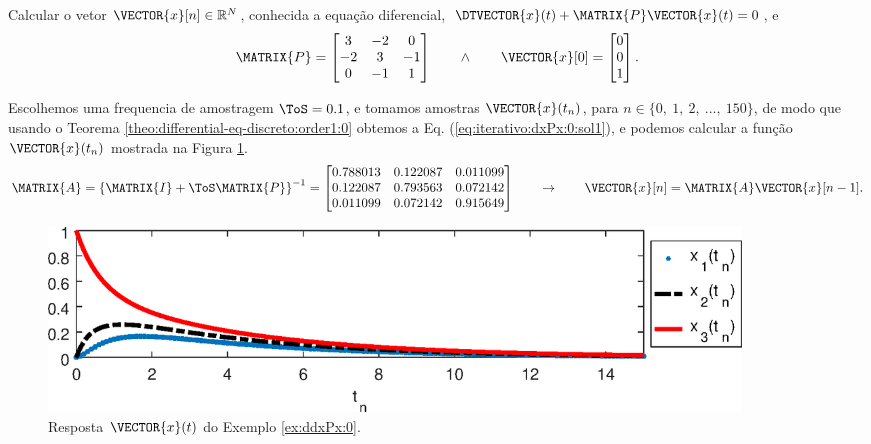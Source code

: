 \begin{example}
\label{ex:iterativo:dxPx:0}
Calcular o vetor $\VECTOR{x}[n] \in \mathbb{R}^{N}$,
conhecida a equação diferencial, $\DTVECTOR{x}(t) + \MATRIX{P} \VECTOR{x}(t)=0$, e
\begin{equation}
\MATRIX{P}=
\begin{bmatrix}
3 & -2 & 0\\
-2 & 3 & -1\\
0 & -1 & 1
\end{bmatrix}
\qquad \wedge \qquad
\VECTOR{x}[0]=
\begin{bmatrix}
0\\
0\\
1
\end{bmatrix}.
\end{equation}
\end{example}


\begin{SolutionT}
\label{ex:iterativo:dxPx:0:sol1}
Escolhemos uma frequencia de amostragem $\ToS=0.1$, e
tomamos amostras $\VECTOR{x}(t_n)$, para $n \in \{0,~ 1,~ 2,~ ...,~ 150\}$, 
de modo que usando o Teorema \ref{theo:differential-eq-discreto:order1:0} obtemos a Eq. (\ref{eq:iterativo:dxPx:0:sol1}),
e podemos calcular a função $\VECTOR{x}(t_n)$ mostrada na Figura \ref{fig:ex:iterativo:dxPx:0}.
\begin{equation}\label{eq:iterativo:dxPx:0:sol1}
\MATRIX{A}=
\left\{\MATRIX{I} + \ToS \MATRIX{P}\right\}^{-1}=
\begin{bmatrix}
   0.788013 & 0.122087 & 0.011099 \\
   0.122087 & 0.793563 & 0.072142 \\
   0.011099 & 0.072142 & 0.915649 
\end{bmatrix}
\qquad \rightarrow \qquad
\VECTOR{x}[n]=\MATRIX{A} \VECTOR{x}[n-1].
\end{equation}

\end{SolutionT}
     \begin{figure}[!h]
         \centering
         \includegraphics[width=0.89\textwidth]{chapters/differential-eq-discreto/mfiles/primeiroorder/primeirooder1.eps}
         \caption{Resposta $\VECTOR{x}(t)$ do Exemplo \ref{ex:ddxPx:0}.}
         \label{fig:ex:iterativo:dxPx:0}
     \end{figure}

